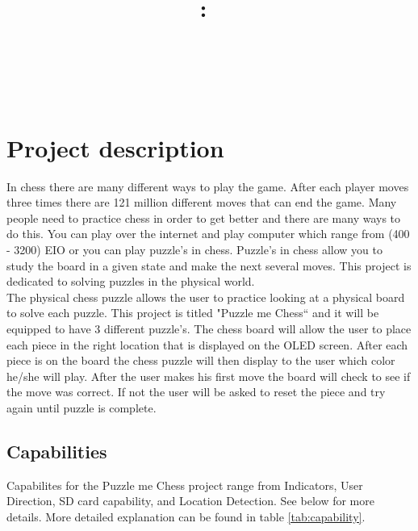 \documentclass[11pt]{article}
\title{\vspace{2in}\textmd{\textbf{\hmwkClass:\ \hmwkTitle}}\\\normalsize\vspace{0.1in}\small{\hmwkDueDate}\\\vspace{0.1in}\large{\textit{\hmwkClassInstructor\ }}\vspace{3in}}
\date{}
\author{\textbf{\hmwkAuthorName}}
\begin{document}
\maketitle %
\newpage

\tableofcontents %


\clearpage 
\section{Project description}
In chess there are many different ways to play the game. After each player moves three times there are 121 million different moves that can end the game. Many people need to practice chess in order to get better and there are many ways to do this. You can play over the internet and play computer which range from (400 - 3200) EIO or you can play puzzle's in chess. Puzzle's in chess allow you to study the board in a given state and make the next several moves. This project is dedicated to solving puzzles in the physical world. 
\\

\noindent The physical chess puzzle allows the user to practice looking at a physical board to solve each puzzle. This project is titled "Puzzle me Chess`` and it will be equipped to have 3 different puzzle's. The chess board will allow the user to place each piece in the right location that is displayed on the OLED screen. After each piece is on the board the chess puzzle will then display to the user which color he/she will play. After the user makes his first move the board will check to see if the move was correct. If not the user will be asked to reset the piece and try again until puzzle is complete. 

\subsection{Capabilities}
Capabilites for the Puzzle me Chess project range from Indicators, User Direction, SD card capability, and Location Detection. See below for more details. More detailed explanation can be found in table \ref{tab:capability}.
\end{document}
